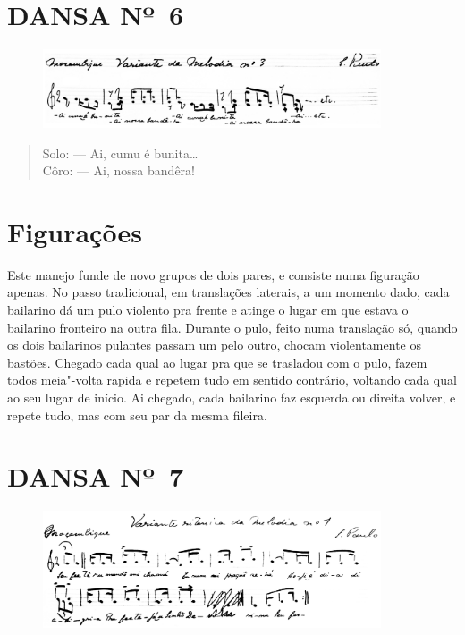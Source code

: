 \pagebreak

\section*{DANSA Nº~6}

\begin{figure}[!ht]
\centering
 \includegraphics[width=100mm]{./imgs/img8.png}
\end{figure}

\begin{verse}
Solo: --- Ai, cumu é bunita\ldots{}\\
Côro: --- Ai, nossa bandêra!
\end{verse}

\section*{Figurações}

Este manejo funde de novo grupos de dois pares, e consiste numa
figuração apenas. No passo tradicional, em translações laterais, a um
momento dado, cada bailarino dá um pulo violento pra frente e atinge o
lugar em que estava o bailarino fronteiro na outra fila. Durante o pulo,
feito numa translação só, quando os dois bailarinos pulantes passam um
pelo outro, chocam violentamente os bastões. Chegado cada qual ao lugar
pra que se trasladou com o pulo, fazem todos meia"-volta rapida e repetem
tudo em sentido contrário, voltando cada qual ao seu lugar de início. Ai
chegado, cada bailarino faz esquerda ou direita volver, e repete tudo,
mas com seu par da mesma fileira.

\pagebreak

\section*{DANSA Nº~7}


\begin{figure}[!ht]
\centering
 \includegraphics[width=100mm]{./imgs/img9.png}
\end{figure}

